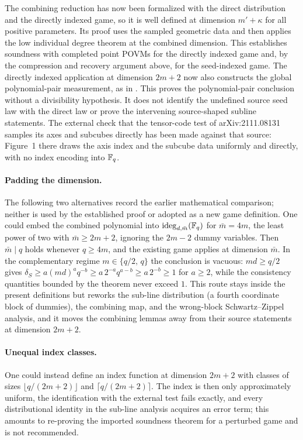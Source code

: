 \documentclass[11pt]{article}
\begin{document}
The combining reduction has now been formalized with the direct distribution
and the directly indexed game, so it is well defined at dimension
$m'+\kappa$ for
all positive parameters.  Its proof uses the sampled geometric data and then
applies the low individual degree theorem at the combined dimension.  This
establishes soundness with completed point POVMs for the directly indexed
game and, by the compression and recovery argument above, for the
seed-indexed game. The directly indexed
application at dimension $2m+2$ now also constructs the global polynomial-pair
measurement, as  in
. This proves the polynomial-pair
conclusion without a divisibility hypothesis. It does not identify the
undefined source seed law with the direct law or prove the intervening
source-shaped subline statements.
The external check that the tensor-code test of arXiv:2111.08131 samples
its axes and subcubes directly has been made against that source: Figure~1
there draws the axis index and the subcube data uniformly and directly,
with no index encoding into $\mathbb{F}_q$.

\paragraph{Padding the dimension.}
The following two alternatives record the earlier mathematical comparison;
neither is used by the established proof or adopted as a new game definition.
One could embed the combined polynomial into
$\mathrm{ideg}_{d,\bar m}(\mathbb{F}_q)$ for $\bar m = 4m$, the least power of two
with $\bar m \ge 2m+2$, ignoring the $2m-2$ dummy variables.  Then
$\bar m \mid q$ holds whenever $q \ge 4m$, and the existing game applies at
dimension $\bar m$.  In the complementary regime $m \in \{q/2,\, q\}$ the
conclusion is vacuous: $md \ge q/2$ gives
$\delta_S \ge a(md)^a q^{-b} \ge a\,2^{-a} q^{a-b} \ge a\,2^{-b} \ge 1$
for $a \ge 2$, while the consistency quantities bounded by the theorem never
exceed $1$.  This route stays inside the present definitions but reworks the
sub-line distribution (a fourth coordinate block of dummies), the combining
map, and the wrong-block Schwartz--Zippel analysis, and it moves the
combining lemmas away from their source statements at dimension $2m+2$.

\paragraph{Unequal index classes.}
One could instead define an index function at dimension $2m+2$ with classes
of sizes $\lfloor q/(2m+2)\rfloor$ and $\lceil q/(2m+2)\rceil$.  The index
is then only approximately uniform, the identification with the external
test fails exactly, and every distributional identity in the sub-line
analysis acquires an error term; this amounts to re-proving the imported
soundness theorem for a perturbed game and is not recommended.
\end{document}
